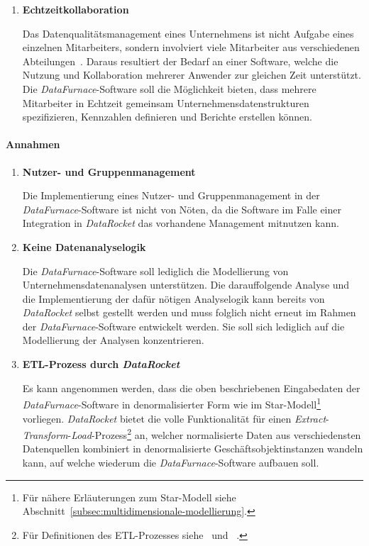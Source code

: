 \documentclass[
  language=german, %
  type=bachelor,%
  ngerman
]{isthesis}
\begin{document}
\begin{content}
\begin{enumerate}
    \item \textbf{Echtzeitkollaboration}

			Das Datenqualitätsmanagement eines Unternehmens ist nicht Aufgabe eines
			einzelnen Mitarbeiters, sondern involviert viele Mitarbeiter aus
			verschiedenen Abteilungen~\cite[][S. 2]{geiger2004data}. Daraus resultiert der
			Bedarf an einer Software, welche die Nutzung und Kollaboration mehrerer
			Anwender zur gleichen Zeit unterstützt. Die \textit{DataFurnace}-Software
			soll die Möglichkeit bieten, dass mehrere Mitarbeiter in Echtzeit gemeinsam
			Unternehmensdatenstrukturen spezifizieren, Kennzahlen
			definieren und Berichte erstellen können.
      
  \end{enumerate}


	\paragraph{Annahmen} 
  \begin{enumerate}
    \item \textbf{Nutzer- und Gruppenmanagement}

		Die Implementierung eines Nutzer- und Gruppenmanagement in der
		\textit{DataFurnace}-Software ist nicht von Nöten, da die Software im
		Falle einer Integration in \textit{DataRocket} das vorhandene Management
		mitnutzen kann.

    \item \textbf{Keine Datenanalyselogik}

      Die \textit{DataFurnace}-Software soll lediglich die Modellierung von
      Unternehmensdatenanalysen unterstützen. Die darauffolgende Analyse und
      die Implementierung der dafür nötigen Analyselogik kann bereits von
      \textit{DataRocket} selbst gestellt werden und muss folglich nicht erneut
      im Rahmen der \textit{DataFurnace}-Software entwickelt werden. Sie soll
      sich lediglich auf die Modellierung der Analysen konzentrieren.

    \item \textbf{\acrshort{ETL}-Prozess durch \textit{DataRocket}}

			Es kann angenommen werden, dass die oben beschriebenen Eingabedaten der
			\textit{DataFurnace}-Software in denormalisierter Form wie im
			Star-Modell\footnote{Für nähere Erläuterungen zum Star-Modell siehe
			Abschnitt~\ref{subsec:multidimensionale-modellierung}.} vorliegen.
			\textit{DataRocket} bietet die volle Funktionalität für einen
			\textit{Extract}-\textit{Transform}-\textit{Load}-Prozess\footnote{Für
			Definitionen des ETL-Prozesses
			siehe~\textsc{\citeauthor{vassiliadis2002conceptual}}
			\citeyearpar{vassiliadis2002conceptual}
			und~\textsc{\citeauthor{trujillo2003uml}} \citeyearpar{trujillo2003uml}.}
			an, welcher normalisierte Daten aus verschiedensten Datenquellen
			kombiniert in denormalisierte Geschäftsobjektinstanzen wandeln kann, auf
			welche wiederum die \textit{DataFurnace}-Software aufbauen soll.


\end{enumerate}
\end{content}
\end{document}
